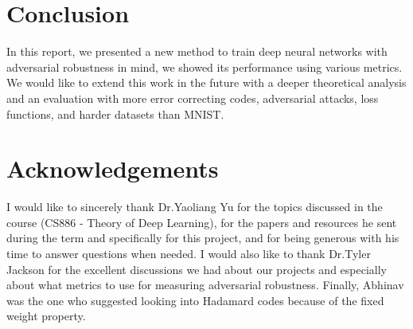 \documentclass{article}
\begin{document}
\section{Conclusion}
In this report, we presented a new method to train deep neural networks with adversarial robustness in mind, we showed its performance using various metrics. We would like to extend this work in the future with a deeper theoretical analysis and an evaluation with more error correcting codes, adversarial attacks, loss functions, and harder datasets than MNIST.

\newpage

\section*{Acknowledgements}
I would like to sincerely thank Dr.Yaoliang Yu for the topics discussed in the course (CS886 - Theory of Deep Learning), for the papers and resources he sent during the term and specifically for this project, and for being generous with his time to answer questions when needed. I would also like to thank Dr.Tyler Jackson for the excellent discussions we had about our projects and especially about what metrics to use for measuring adversarial robustness. Finally, Abhinav was the one who suggested looking into Hadamard codes because of the fixed weight property. 
\nocite{*}

%

%

\end{document}
